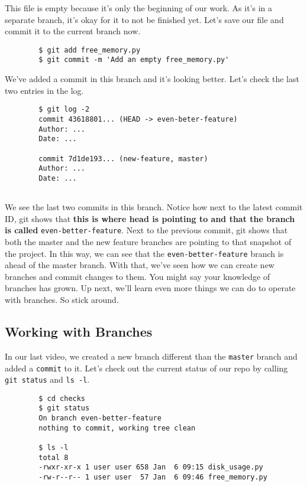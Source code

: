 	This file is empty because it's only the beginning of our work. As it's in a separate branch, it's okay for it to not be finished yet. Let's save our file and commit it to the current branch now.
	
	\begin{verbatim}
		$ git add free_memory.py
		$ git commit -m 'Add an empty free_memory.py'
	\end{verbatim}
	
	We've added a commit in this branch and it's looking better. Let's check the last two entries in the log.
	
	\begin{verbatim}
		$ git log -2
		commit 43618801... (HEAD -> even-beter-feature)
		Author: ...
		Date: ...
		
		commit 7d1de193... (new-feature, master)
		Author: ...
		Date: ...
		
	\end{verbatim}
	
	We see the last two commits in this branch. Notice how next to the latest commit ID, git shows that \textbf{this is where head is pointing to and that the branch is called} \verb|even-better-feature|. Next to the previous commit, git shows that both the master and the new feature branches are pointing to that snapshot of the project. In this way, we can see that the \verb|even-better-feature| branch is ahead of the master branch. With that, we've seen how we can create new branches and commit changes to them. You might say your knowledge of branches has grown. Up next, we'll learn even more things we can do to operate with branches. So stick around.
	
	\subsection{Working with Branches}	
	
	In our last video, we created a new branch different than the \texttt{master} branch and added a \texttt{commit} to it. Let's check out the current status of our repo by calling \texttt{git status} and \verb|ls -l|.
	
	\begin{verbatim}
		$ cd checks
		$ git status
		On branch even-better-feature
		nothing to commit, working tree clean
		
		$ ls -l
		total 8
		-rwxr-xr-x 1 user user 658 Jan  6 09:15 disk_usage.py
		-rw-r--r-- 1 user user  57 Jan  6 09:46 free_memory.py		
	\end{verbatim}	
	
